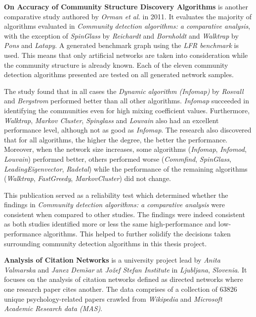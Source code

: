 \vspace*{1em}

\textbf{On Accuracy of Community Structure Discovery Algorithms} is another comparative study authored by \textit{Orman et al.} \cite{orman2011accuracy} in 2011. It evaluates the majority of algorithms evaluated in \textit{Community detection algorithms: a comparative analysis}, with the exception of \textit{SpinGlass} by \textit{Reichardt} and \textit{Bornholdt} and \textit{Walktrap} by \textit{Pons} and \textit{Latapy}. A generated benchmark graph using the \textit{LFR benchmark} is used. This means that only artificial networks are taken into consideration while the community structure is already known. Each of the eleven community detection algorithms presented are tested on all generated network samples.

The study found that in all cases the \textit{Dynamic algorithm (Infomap)} by \textit{Rosvall} and \textit{Bergstrom} performed better than all other algorithms. \textit{Infomap} succeeded in identifying the communities even for high mixing coefficient values. Furthermore, \textit{Walktrap}, \textit{Markov Cluster}, \textit{Spinglass} and \textit{Louvain} also had an excellent performance level, although not as good as \textit{Infomap}. The research also discovered that for all algorithms, the higher the degree, the better the performance. Moreover, when the network size increases, some algorithms (\textit{Infomap}, \textit{Infomod}, \textit{Louvain}) performed better, others performed worse (\textit{Commfind}, \textit{SpinGlass}, \textit{LeadingEigenvector}, \textit{Radetal}) while the performance of the remaining algorithms (\textit{Walktrap}, \textit{FastGreedy}, \textit{MarkovCluster}) did not change.

This publication served as a reliability test which determined whether the findings in \textit{Community detection algorithms: a comparative analysis} were consistent when compared to other studies. The findings were indeed consistent as both studies identified more or less the same high-performance and low-performance algorithms. This helped to further solidify the decisions taken surrounding community detection algorithms in this thesis project.

\vspace*{1em}

\textbf{Analysis of Citation Networks} is a university project lead by \textit{Anita Valmarska} and \textit{Janez Dem\u{s}ar} at \textit{Jo\v{z}ef Stefan Institute} in \textit{Ljubljana}, \textit{Slovenia}. It focuses on the analysis of citation networks defined as directed networks where one research paper cites another. The data comprises of a collection of 63826 unique psychology-related papers crawled from \textit{Wikipedia} and \textit{Microsoft Academic Research data (MAS)}.

